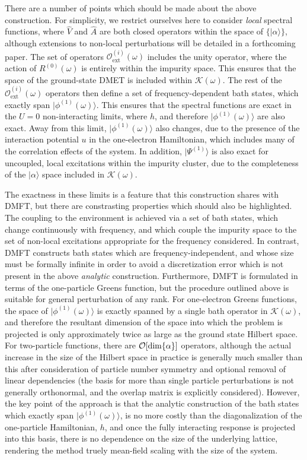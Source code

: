 \documentclass[aps,showpacs,twocolumn,nobibnotes]{revtex4}
\begin{document}
There are a number of points which should be made about the above construction. For simplicity, we restrict ourselves here to consider {\em local} spectral functions, where
${\hat V}$ and ${\hat A}$ are both closed operators within the space of $\{|\alpha \rangle \}$, although extensions to non-local perturbations will be detailed in a forthcoming paper.
The set of operators $\mathcal{O}_{\mathrm{ext}}^{(i)}(\omega)$ includes the unity operator, where the action of $R^{(0)}(\omega)$ is entirely within the impurity space. This ensures that
the space of the ground-state DMET is included within $\mathcal{K}(\omega)$. The rest of the $\mathcal{O}_{\mathrm{ext}}^{(i)}(\omega)$ operators then define a set of frequency-dependent
bath states, which exactly span $|\phi^{(1)}(\omega) \rangle$. This ensures that the spectral functions are exact in the $U=0$ non-interacting limits, where
$h$, and therefore $|\phi^{(1)}(\omega) \rangle$ are also exact. Away from this limit, 
$|\phi^{(1)}(\omega) \rangle$ also changes, due to the presence of the interaction potential $u$ in the one-electron Hamiltonian, which includes many of the correlation effects of the system.
In addition, $|\Psi^{(1)} \rangle $ is also exact for uncoupled, local excitations within the impurity cluster, due
to the completeness of the $|\alpha \rangle$ space included in $\mathcal{K}(\omega)$.

The exactness in these limits is a feature that this construction shares with DMFT, but there are constrasting properties which should also be highlighted. The coupling to the environment
is achieved via a set of bath states, which change continuously with frequency, and which couple the impurity space to the set of non-local excitations appropriate for the frequency considered. 
In contrast, DMFT constructs bath states which are
frequency-independent, and whose size must be formally infinite in order to avoid a discretization error which is not present in the above {\em analytic} construction. Furthermore,
DMFT is formulated in terms of the one-particle Greens function, but the procedure outlined above is suitable for general perturbation of any rank. For one-electron Greens functions,
the space of $|\phi^{(1)}(\omega) \rangle$ is exactly spanned by a single bath operator in $\mathcal{K}(\omega)$, and therefore the resultant dimension of the space into which the problem
is projected is only approximately twice as large as the ground state Hilbert space. For two-particle functions, there are $\mathcal{O}[\text{\textnormal {dim}} \{\alpha\}]$ operators, although the actual
increase in the size of the Hilbert space in practice is generally much smaller than this after consideration of particle number symmetry and optional removal of linear dependencies (the basis
for more than single particle perturbations is not generally orthonormal, and the overlap matrix is explicitly considered). However, the key point of the approach is that the analytic construction
of the bath states which exactly span $|\phi^{(1)}(\omega) \rangle$, is no more costly than the diagonalization of the one-particle Hamiltonian, $h$, and once the fully interacting response is
projected into this basis, there is no dependence on the size of the underlying lattice, rendering the method truely mean-field scaling with the size of the system. 
\end{document}
